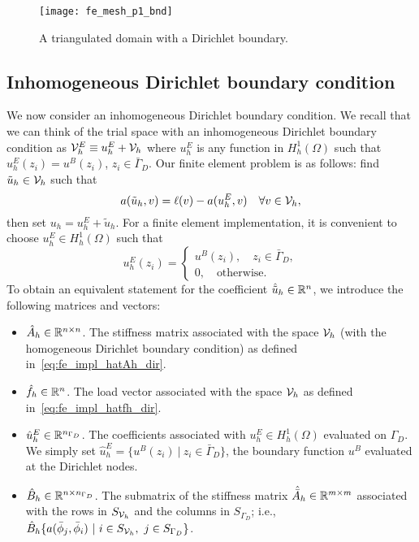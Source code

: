 \begin{figure}
  \centering
  \texttt{[image: fe\_mesh\_p1\_bnd]}
  \caption{A triangulated domain with a Dirichlet boundary.}
  \label{fig:fe_impl_mesh_p1_bnd}
\end{figure}

\subsection{Inhomogeneous Dirichlet boundary condition}
We now consider an inhomogeneous Dirichlet boundary condition. We recall that we can think of the trial space with an inhomogeneous Dirichlet boundary condition as $\mathcal{V}^E_h \equiv u^E_h + \mathcal{V}_h$ where $u^E_h$ is any function in $H^1_h(\Omega)$ such that $u^E_h(z_i) = u^B(z_i)$, $z_i \in \bar \Gamma_D$.  Our finite element problem is as follows: find $\tilde u_h \in \mathcal{V}_h$ such that
\begin{equation*}
  a(\tilde u_h, v) = \ell(v) - a(u^E_h,v) \quad \forall v \in \mathcal{V}_h,
\end{equation*}
then set $u_h = u^E_h + \tilde u_h$. For a finite element implementation, it is convenient to choose $u^E_h \in H^1_h(\Omega)$ such that
\begin{equation*}
  u^E_h(z_i) = \begin{cases}
    u^B(z_i), \quad z_i \in \bar \Gamma_D , \\
    0, \quad \text{otherwise}.
  \end{cases}
\end{equation*}
To obtain an equivalent statement for the coefficient $\hat{\tilde u}_h \in \mathbb{R}^n$, we introduce the following matrices and vectors:
\begin{itemize}
\item $\hat A_h \in \mathbb{R}^{n \times n}$. The stiffness matrix associated with the  space $\mathcal{V}_h$ (with the homogeneous Dirichlet boundary condition) as defined in~\eqref{eq:fe_impl_hatAh_dir}.%
\item $\hat f_h \in \mathbb{R}^n$. The load vector associated with the space $\mathcal{V}_h$ as defined in~\eqref{eq:fe_impl_hatfh_dir}. %
\item $\hat u^E_h \in \mathbb{R}^{n_{\Gamma_D}}$. The coefficients associated with $u^E_h \in H^1_h(\Omega)$ evaluated on $\Gamma_D$.  We simply set $\hat u^E_h = \{ u^B(z_i) \ | \ z_i \in \bar \Gamma_D \}$, the boundary function $u^B$ evaluated at the Dirichlet nodes.
\item $\hat B_h \in \mathbb{R}^{n \times n_{\Gamma_D}}$.  The submatrix of the stiffness matrix $\hat{\bar A}_h \in \mathbb{R}^{m \times m}$ associated with the rows in $S_{\mathcal{V}_h}$ and the columns in $S_{\Gamma_D}$; i.e., $\hat B_h \{ a(\bar \phi_j, \bar \phi_i) \ | \ i \in S_{\mathcal{V}_h}, \ j \in S_{\Gamma_D} \}$.
\end{itemize}
